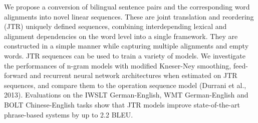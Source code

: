 We propose a conversion of bilingual sentence pairs and the corresponding word alignments into novel linear sequences. These are joint translation and reordering (JTR) uniquely defined sequences, combining interdepending lexical and alignment dependencies on the word level into a single framework. They are constructed in a simple manner while capturing multiple alignments and empty words. JTR sequences can be used to train a variety of models. We investigate the performances of n-gram models with modified Kneser-Ney smoothing, feed-forward and recurrent neural network architectures when estimated on JTR sequences, and compare them to the operation sequence model (Durrani et al., 2013). Evaluations on the IWSLT German-English, WMT German-English and BOLT Chinese-English tasks show that JTR models improve state-of-the-art phrase-based systems by up to 2.2 BLEU.
